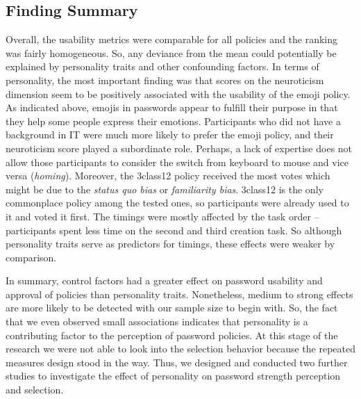 \subsection{Finding Summary}
Overall, the usability metrics were comparable for all policies and the ranking was fairly homogeneous. So, any deviance from the mean could potentially be explained by personality traits and other confounding factors. In terms of personality, the most important finding was that scores on the neuroticism dimension seem to be positively associated with the usability of the emoji policy. As indicated above, emojis in passwords appear to fulfill their purpose in that they help some people express their emotions. Participants who did not have a background in IT were much more likely to prefer the emoji policy, and their neuroticism score played a subordinate role. Perhaps, a lack of expertise does not allow those participants to consider the switch from keyboard to mouse and vice versa (\textit{homing}). Moreover, the 3class12 policy received the most votes which might be due to the \textit{status quo bias} or \textit{familiarity bias}. 3class12 is the only commonplace policy among the tested ones, so participants were already used to it and voted it first. The timings were mostly affected by the task order -- participants spent less time on the second and third creation task. So although personality traits serve as predictors for timings, these effects were weaker by comparison. 

In summary, control factors had a greater effect on password usability and approval of policies than personality traits. Nonetheless, medium to strong effects are more likely to be detected with our sample size to begin with. So, the fact that we even observed small associations indicates that personality is a contributing factor to the perception of password policies. At this stage of the research we were not able to look into the selection behavior because the repeated measures design stood in the way. Thus, we designed and conducted two further studies to investigate the effect of personality on password strength perception and selection. 



